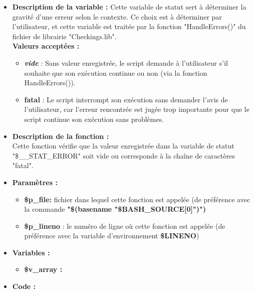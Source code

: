 \documentclass[a4paper,10pt]{article}
\begin{document}
\begin{itemize}
    \item \textbf{Description de la variable :} Cette variable de statut sert à déterminer la gravité d'une erreur selon le contexte. Ce choix est à déterminer par l'utilisateur, et cette variable est traitée par la fonction "HandleErrors()" du fichier de librairie "Checkings.lib".\\[1\baselineskip]

    \textbf{Valeurs acceptées :}
    \begin{itemize}
        \item \textbf{\textit{vide}} : Sans valeur enregistrée, le script demande à l'utilisateur s'il souhaite que son exécution continue ou non (via la fonction HandleErrors()).\\[1\baselineskip]
        \item \textbf{fatal} : Le script interrompt son exécution sans demander l'avis de l'utilisateur, car l'erreur rencontrée est jugée trop importante pour que le script continue son exécution sans problèmes.\\[1\baselineskip]
    \end{itemize}

    \item \textbf{Description de la fonction :}\\
        Cette fonction vérifie que la valeur enregistrée dans la variable de statut "\$\_\_STAT\_ERROR" soit vide ou corresponde à la chaîne de caractères "fatal".\\[1\baselineskip]

    \item \textbf{Paramètres :}
    \begin{itemize}
        \item \textbf{\color{orange}\$p\_file\color{white}:} fichier dans lequel cette fonction est appelée (de préférence avec la commande \textbf{"\$(\color{gray}basename \color{white}"\color{orange}\$BASH\_SOURCE[0]\color{white}")")}\\[1\baselineskip]

        \item \color{orange}\textbf{\$p\_lineno}\color{white} : le numéro de ligne où cette fonction est appelée (de préférence avec la variable d'environnement \textbf{\color{orange}\$LINENO})\\[1\baselineskip]
    \end{itemize}

    \item \textbf{Variables :}
    \begin{itemize}
        \item \textbf{\color{orange}\$v\_array\color{white} :}\\[1\baselineskip]
    \end{itemize}

    \item \textbf{Code :}
\end{itemize}
\end{document}
